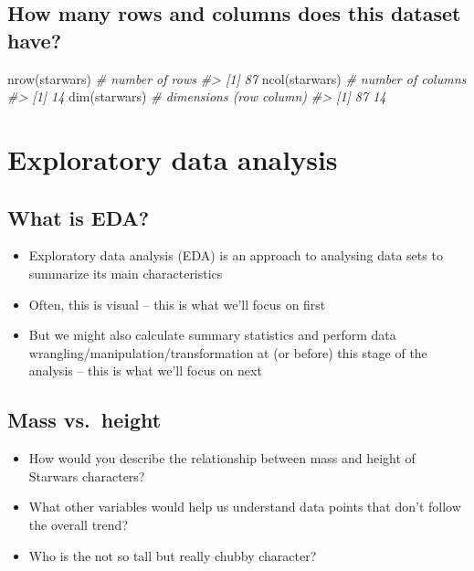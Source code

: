 \documentclass[
]{book}
\newenvironment{Shaded}{\begin{snugshade}}{\end{snugshade}}
\newcommand{\CommentTok}[1]{\textcolor[rgb]{0.56,0.35,0.01}{\textit{#1}}}
\newcommand{\FunctionTok}[1]{\textcolor[rgb]{0.00,0.00,0.00}{#1}}
\newcommand{\NormalTok}[1]{#1}
\providecommand{\tightlist}{%
  \setlength{\itemsep}{0pt}\setlength{\parskip}{0pt}}
\theoremstyle{definition}
\theoremstyle{definition}
\theoremstyle{definition}
\theoremstyle{definition}
\theoremstyle{remark}
\begin{document}
\hypertarget{how-many-rows-and-columns-does-this-dataset-have}{%
\section{How many rows and columns does this dataset have?}\label{how-many-rows-and-columns-does-this-dataset-have}}

\begin{Shaded}
\begin{Highlighting}[]
\FunctionTok{nrow}\NormalTok{(starwars) }\CommentTok{\# number of rows}
\CommentTok{\#\textgreater{} [1] 87}
\FunctionTok{ncol}\NormalTok{(starwars) }\CommentTok{\# number of columns}
\CommentTok{\#\textgreater{} [1] 14}
\FunctionTok{dim}\NormalTok{(starwars)  }\CommentTok{\# dimensions (row column)}
\CommentTok{\#\textgreater{} [1] 87 14}
\end{Highlighting}
\end{Shaded}

\hypertarget{exploratory-data-analysis}{%
\chapter{Exploratory data analysis}\label{exploratory-data-analysis}}

\hypertarget{what-is-eda}{%
\section{What is EDA?}\label{what-is-eda}}

\begin{itemize}
\tightlist
\item
  Exploratory data analysis (EDA) is an approach to analysing data sets to summarize its main characteristics
\item
  Often, this is visual -- this is what we'll focus on first
\item
  But we might also calculate summary statistics and perform data wrangling/manipulation/transformation at (or before) this stage of the analysis -- this is what we'll focus on next
\end{itemize}

\hypertarget{mass-vs.-height}{%
\section{Mass vs.~height}\label{mass-vs.-height}}

\begin{itemize}
\tightlist
\item
  How would you describe the relationship between mass and height of Starwars characters?
\item
  What other variables would help us understand data points that don't follow the overall trend?
\item
  Who is the not so tall but really chubby character?
\end{itemize}
\end{document}
